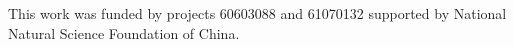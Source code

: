 \documentclass[journal]{IEEEtran}
\begin{document}
This work was funded by projects 60603088 and 61070132 supported by National Natural Science Foundation of China.

%
%



%
%
\end{document}
